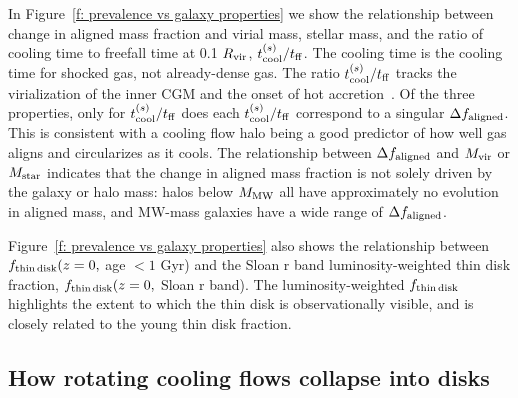 \documentclass[fleqn,usenatbib]{mnras}
\begin{document}
In Figure~\ref{f: prevalence vs galaxy properties} we show the relationship between change in aligned mass fraction and virial mass, stellar mass, and the ratio of cooling time to freefall time at 0.1 $R_{\rm vir}$, $t_{\rm cool}^{(s)} / t_{\rm ff}$.
The cooling time is the cooling time for shocked gas, not already-dense gas.
The ratio $t_{\rm cool}^{(s)} / t_{\rm ff}$ tracks the virialization of the inner CGM and the onset of hot accretion~\citep{Stern2020}.
Of the three properties, only for $t_{\rm cool}^{(s)} / t_{\rm ff}$ does each $t_{\rm cool}^{(s)} / t_{\rm ff}$ correspond to a singular $\Delta f_{\rm aligned}$.
This is consistent with a cooling flow halo being a good predictor of how well gas aligns and circularizes as it cools.
The relationship between $\Delta f_{\rm aligned}$ and $M_{\rm vir}$ or $M_{\rm star}$ indicates that the change in aligned mass fraction is not solely driven by the galaxy or halo mass:
halos below $M_{\rm MW}$ all have approximately no evolution in aligned mass, and MW-mass galaxies have a wide range of $\Delta f_{\rm aligned}$.

Figure~\ref{f: prevalence vs galaxy properties} also shows the relationship between $f_{\rm thin\,disk}(z=0,$ age $<1$ Gyr) and the Sloan r band luminosity-weighted thin disk fraction, $f_{\rm thin\,disk}(z=0,$ Sloan r band).
The luminosity-weighted $f_{\rm thin\,disk}$ highlights the extent to which the thin disk is observationally visible, and is closely related to the young thin disk fraction.

\subsection{How rotating cooling flows collapse into disks}
\label{s: mechanics}
\end{document}
